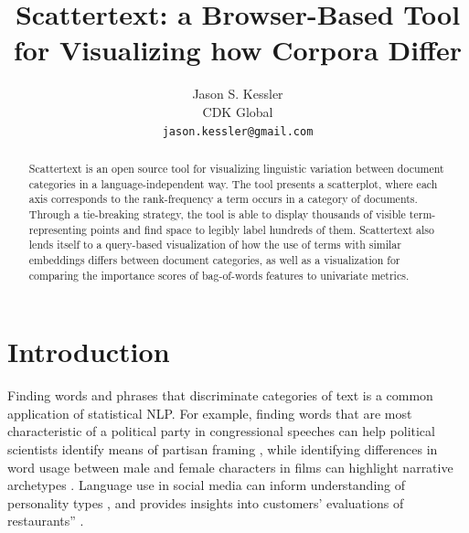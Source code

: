 \documentclass[11pt,a4paper]{article}
\title{Scattertext: a Browser-Based Tool for Visualizing how Corpora Differ}
\author{Jason S. Kessler \\
  CDK Global \\
  {\tt jason.kessler@gmail.com}  \\}
\date{}
\begin{document}
\maketitle
\begin{abstract}
Scattertext is an open source tool for visualizing linguistic variation between document categories in a language-independent way. The tool presents a scatterplot, where each axis corresponds to the rank-frequency a term occurs in a category of documents.  Through a tie-breaking strategy, the tool is able to display thousands of visible term-representing points and find space to legibly label hundreds of them.   Scattertext also lends itself to a query-based visualization of how the use of terms with similar embeddings differs between document categories, as well as a visualization for comparing the importance scores of bag-of-words features to univariate metrics.
\end{abstract}
\section{Introduction}
Finding words and phrases that discriminate categories of text is a common application of statistical NLP. For example, finding words that are most characteristic of a political party in congressional speeches can help political scientists identify means of partisan framing \cite{monroe08,grimmer2010}, while identifying differences in word usage between male and female characters in films can highlight narrative archetypes \cite{schofield2016gender}.  Language use in social media can inform understanding of personality types \cite{Schwartz13}, and provides insights into customers' evaluations of restaurants” \cite{jurafsky2014}.
\end{document}
